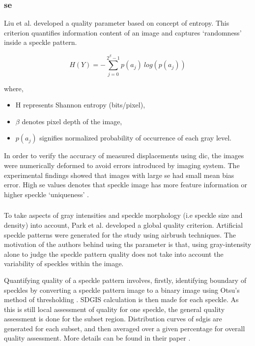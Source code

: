    \subsubsection{\gls{se}}
        Liu et al. developed a quality parameter based on concept of entropy. This criterion quantifies information content of an image and captures `randomness' inside a speckle pattern.

        \begin{equation}
            H(Y) = - \displaystyle \sum_{j=0}^{2^{\beta} - 1} p(a_j)\ log(p(a_j)) 
        \end{equation}

        where,
        \begin{itemize}
            \item H represents Shannon entropy (bits/pixel), 
            \item $\beta$ denotes pixel depth of the image,
            \item $p(a_j)$ signifies normalized probability of occurrence of each gray level. 
        \end{itemize}

        \noindent In order to verify the accuracy of measured displacements using \gls{dic}, the images were numerically deformed to avoid errors introduced by imaging system. The experimental findings showed that images with large \gls{se} had small mean bias error. High \gls{se} values denotes that speckle image has more feature information or higher speckle `uniqueness' \cite{liu_shannon}.

    \subsubsection{}
        To take aspects of gray intensities and speckle morphology (i.e speckle size and density) into account, Park et al. developed a global quality criterion. Artificial speckle patterns were generated for the study using airbrush techniques. The motivation of the authors behind using ths parameter is that, using gray-intensity alone to judge the speckle pattern quality does not take into account the variability of speckles within the image. 
        
        \vspace{5mm}
        \noindent Quantifying quality of a speckle pattern involves, firstly, identifying boundary of speckles by converting a speckle pattern image to a binary image using Otsu's method of thresholding \cite{otsu}. \gls{SDGIS} calculation is then made for each speckle. As this is still local assessment of quality for one speckle, the general quality assessment is done for the subset region. Distribution curves of \gls{sdgis} are generated for each subset, and then averaged over a given percentage for overall quality assessment. More details can be found in their paper \cite{park_sdgis}.

